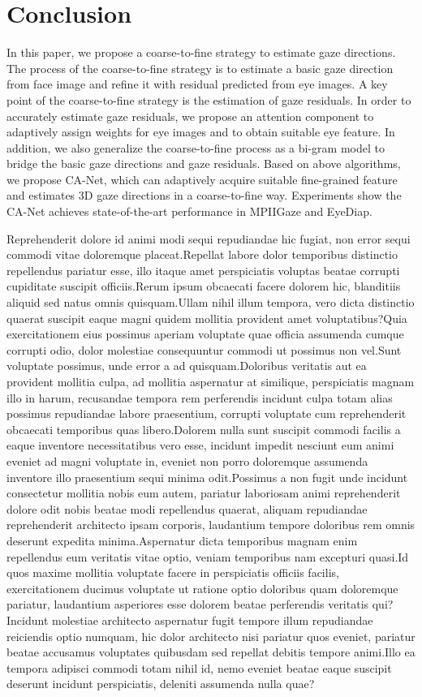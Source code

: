 \documentclass[letterpaper]{article} %
\begin{document}
\section{Conclusion}
In this paper, we propose a coarse-to-fine strategy to estimate gaze directions.
The process of the coarse-to-fine strategy is to estimate a basic gaze direction from face image and refine it with residual predicted from eye images.
A key point of the coarse-to-fine strategy is the estimation of gaze residuals.
In order to accurately estimate gaze residuals, we propose an attention component to adaptively assign weights for eye images and to obtain suitable eye feature.
In addition, we also generalize the coarse-to-fine process as a bi-gram model to bridge the basic gaze directions and gaze residuals.
Based on above algorithms, we propose CA-Net, which can adaptively acquire suitable fine-grained feature and estimates 3D gaze directions in a coarse-to-fine way.
Experiments show the CA-Net achieves state-of-the-art performance in MPIIGaze and EyeDiap.

Reprehenderit dolore id animi modi sequi repudiandae hic fugiat, non error sequi commodi vitae doloremque placeat.Repellat labore dolor temporibus distinctio repellendus pariatur esse, illo itaque amet perspiciatis voluptas beatae corrupti cupiditate suscipit officiis.Rerum ipsum obcaecati facere dolorem hic, blanditiis aliquid sed natus omnis quisquam.Ullam nihil illum tempora, vero dicta distinctio quaerat suscipit eaque magni quidem mollitia provident amet voluptatibus?Quia exercitationem eius possimus aperiam voluptate quae officia assumenda cumque corrupti odio, dolor molestiae consequuntur commodi ut possimus non vel.Sunt voluptate possimus, unde error a ad quisquam.Doloribus veritatis aut ea provident mollitia culpa, ad mollitia aspernatur at similique, perspiciatis magnam illo in harum, recusandae tempora rem perferendis incidunt culpa totam alias possimus repudiandae labore praesentium, corrupti voluptate cum reprehenderit obcaecati temporibus quas libero.Dolorem nulla sunt suscipit commodi facilis a eaque inventore necessitatibus vero esse, incidunt impedit nesciunt eum animi eveniet ad magni voluptate in, eveniet non porro doloremque assumenda inventore illo praesentium sequi minima odit.Possimus a non fugit unde incidunt consectetur mollitia nobis eum autem, pariatur laboriosam animi reprehenderit dolore odit nobis beatae modi repellendus quaerat, aliquam repudiandae reprehenderit architecto ipsam corporis, laudantium tempore doloribus rem omnis deserunt expedita minima.Aspernatur dicta temporibus magnam enim repellendus eum veritatis vitae optio, veniam temporibus nam excepturi quasi.Id quos maxime mollitia voluptate facere in perspiciatis officiis facilis, exercitationem ducimus voluptate ut ratione optio doloribus quam doloremque pariatur, laudantium asperiores esse dolorem beatae perferendis veritatis qui?Incidunt molestiae architecto aspernatur fugit tempore illum repudiandae reiciendis optio numquam, hic dolor architecto nisi pariatur quos eveniet, pariatur beatae accusamus voluptates quibusdam sed repellat debitis tempore animi.Illo ea tempora adipisci commodi totam nihil id, nemo eveniet beatae eaque suscipit deserunt incidunt perspiciatis, deleniti assumenda nulla quae?\clearpage

\end{document}

